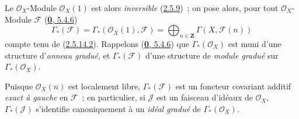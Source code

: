 \begin{env}[2.6.1]
\label{II.2.6.1-fr}
Le $\mathcal{O}_X$-Module $\mathcal{O}_X(1)$ est alors
\emph{inversible} (\hyperref[II.2.5.9-fr]{2.5.9})~; on pose alors, pour tout
$\mathcal{O}_X$-Module $\mathcal{F}$
(\hyperref[0.5.4.6-fr]{\textbf{0}, 5.4.6})
\[
\label{II.2.6.1.1-fr}
  \Gamma_*(\mathcal{F})
  =\Gamma_*(\mathcal{O}_X(1),\mathcal{F})
  =\bigoplus_{n\in\mathbf{Z}}\Gamma(X,\mathcal{F}(n))
\tag{2.6.1.1}
\]
compte tenu de (\hyperref[II.2.5.14.2-fr]{2.5.14.2}). Rappelons
(\hyperref[0.5.4.6-fr]{\textbf{0}, 5.4.6}) que $\Gamma_*(\mathcal{O}_X)$ est muni
d'une structure d'\emph{anneau gradué}, et $\Gamma_*(\mathcal{F})$ d'une
structure de
\emph{module gradué} sur $\Gamma_*(\mathcal{O}_X)$.

Puisque $\mathcal{O}_X(n)$ est localement libre, $\Gamma_*(\mathcal{F})$
est un foncteur covariant additif
\emph{exact à gauche} en $\mathcal{F}$~; en particulier, si $\mathcal{J}$
est un faisceau d'idéaux de $\mathcal{O}_X$, $\Gamma_*(\mathcal{J})$
s'identifie canoniquement à un
\emph{idéal gradué} de $\Gamma_*(\mathcal{O}_X)$.
\end{env}


